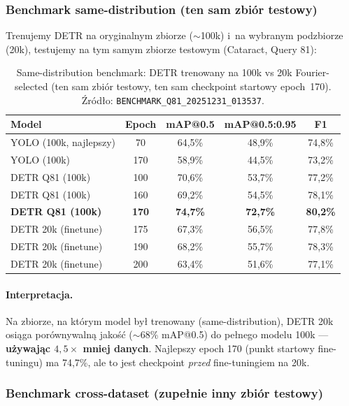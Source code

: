 \subsubsection{Benchmark same-distribution (ten sam zbiór testowy)}

Trenujemy DETR na oryginalnym zbiorze ($\sim$100k) i~na wybranym podzbiorze
(20k), testujemy na tym samym zbiorze testowym (Cataract, Query 81):

\begin{table}[h]
\centering
\caption{Same-distribution benchmark: DETR trenowany na 100k vs 20k
         Fourier-selected (ten sam zbiór testowy, ten sam checkpoint startowy
         epoch~170).  Źródło: \texttt{BENCHMARK\_Q81\_20251231\_013537}.}
\label{tab:bench_same}
\begin{tabular}{lcccc}
\toprule
\textbf{Model} & \textbf{Epoch} & \textbf{mAP@0.5} &
    \textbf{mAP@0.5:0.95} & \textbf{F1} \\
\midrule
YOLO (100k, najlepszy) & 70  & 64{,}5\% & 48{,}9\% & 74{,}8\% \\
YOLO (100k)            & 170 & 58{,}9\% & 44{,}5\% & 73{,}2\% \\
\midrule
DETR Q81 (100k)        & 100 & 70{,}6\% & 53{,}7\% & 77{,}2\% \\
DETR Q81 (100k)        & 160 & 69{,}2\% & 54{,}5\% & 78{,}1\% \\
\textbf{DETR Q81 (100k)} & \textbf{170} & \textbf{74{,}7\%} &
    \textbf{72{,}7\%} & \textbf{80{,}2\%} \\
\midrule
DETR 20k (finetune)    & 175 & 67{,}3\% & 56{,}5\% & 77{,}8\% \\
DETR 20k (finetune)    & 190 & 68{,}2\% & 55{,}7\% & 78{,}3\% \\
DETR 20k (finetune)    & 200 & 63{,}4\% & 51{,}6\% & 77{,}1\% \\
\bottomrule
\end{tabular}
\end{table}

\paragraph{Interpretacja.}
Na zbiorze, na którym model był trenowany (same-distribution), DETR 20k
osiąga porównywalną jakość ($\sim$68\% mAP@0.5) do pełnego modelu 100k
--- \textbf{używając $4{,}5\times$ mniej danych}.  Najlepszy epoch 170
(punkt startowy fine-tuningu) ma 74{,}7\%, ale to jest checkpoint
\emph{przed} fine-tuningiem na 20k.

\subsubsection{Benchmark cross-dataset (zupełnie inny zbiór testowy)}

